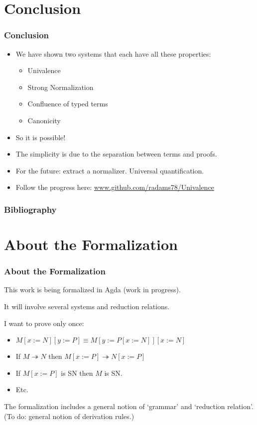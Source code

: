 \section{Conclusion}

\begin{frame}
\frametitle{Conclusion}
\begin{itemize}[<+->]
\item
We have shown two systems that each have all these properties:
\begin{itemize}
\item
Univalence
\item
Strong Normalization
\item
Confluence of typed terms
\item
Canonicity
\end{itemize}
\item
So it is possible!
\item
The simplicity is due to the separation between terms and proofs.
\item
For the future: extract a normalizer.  Universal quantification.
\item
Follow the progress here: \url{www.github.com/radams78/Univalence}
\end{itemize}
\end{frame}

\todos

\begin{frame}
\frametitle{Bibliography}

\end{frame}

\appendix

\section{About the Formalization}

\begin{frame}
\frametitle{About the Formalization}
This work is being formalized in Agda (work in progress).
\pause

It will involve several systems and reduction relations.

I want to prove only once:
\pause
\begin{itemize}[<+->]
\item
$M[x:=N][y:=P] \equiv M[y:=P[x:=N]][x:=N]$
\item
If $M \twoheadrightarrow N$ then $M[x:=P] \twoheadrightarrow N[x:=P]$
\item
If $M[x:=P]$ is SN then $M$ is SN.
\item
Etc.
\end{itemize}
\pause
The formalization includes a general notion of `grammar' and `reduction relation'.  (To do: general notion of derivation rules.)
\end{frame}

